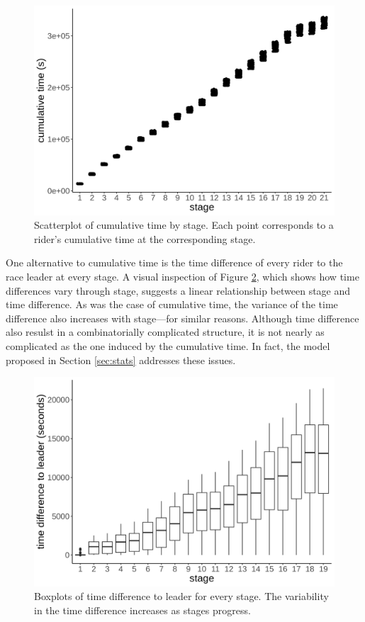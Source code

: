 \documentclass[aos,preprint]{imsart}
\begin{document}
\begin{figure}[h]
  \centering
  \includegraphics[scale=0.65]{fig/cumtime_stage.png}
  \caption{Scatterplot of cumulative time by stage. Each point corresponds to a rider's cumulative time at the corresponding stage.}
  \label{fig:cumtime}
\end{figure}


One alternative to cumulative time is the time difference of every rider to the race leader at every stage. A visual inspection of Figure \ref{fig:timediff_stage}, which shows how time differences vary through stage, suggests a linear relationship between stage and time difference. As was the case of cumulative time, the variance of the time difference also increases with stage---for similar reasons. Although time difference also resulst in a combinatorially complicated structure, it is not nearly as complicated as the one induced by the cumulative time. In fact, the model proposed in Section \ref{sec:stats} addresses these issues. \\



\begin{figure}[h]
  \centering
  \includegraphics[scale=0.65]{fig/timediff_stage.png}
  \caption{Boxplots of time difference to leader for every stage. The variability in the time difference increases as stages progress.}
  \label{fig:timediff_stage}
\end{figure}
\end{document}
